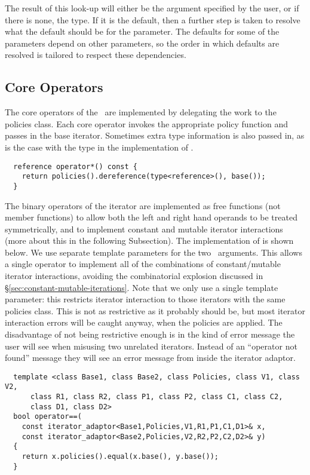 \documentclass{netobjectdays}
\newcommand{\iteratoradaptor}{\code{iterator\_\-adaptor}}
\begin{document}
The result of this look-up will either be the argument specified by the
user, or if there is none, the  type. If it is
the default, then a further step is taken to resolve what the default
should be for the parameter. The defaults for some of the parameters
depend on other parameters, so the order in which defaults are
resolved is tailored to respect these dependencies.


\subsection{Core Operators}

The core operators of the \iteratoradaptor\ are implemented by
delegating the work to the policies class. Each core operator invokes
the appropriate policy function and passes in the base
iterator. Sometimes extra type information is also passed in, as is
the case with the  type in the implementation of
.

{\footnotesize
\begin{verbatim}
  reference operator*() const {
    return policies().dereference(type<reference>(), base());
  }
\end{verbatim}
}

The binary operators of the iterator are implemented as free functions
(not member functions) to allow both the left and right hand operands
to be treated symmetrically, and to implement constant and mutable
iterator interactions (more about this in the following
Subsection). The implementation of  is shown below.
We use separate template parameters for the two \iteratoradaptor\
arguments. This allows a single operator to implement all of the
combinations of constant/mutable iterator interactions, avoiding the
combinatorial explosion discussed in
\S\ref{sec:constant-mutable-iterations}. Note that we only use a
single \code{Policies} template parameter: this restricts iterator
interaction to those iterators with the same policies class.  This is
not as restrictive as it probably should be, but most iterator
interaction errors will be caught anyway, when the policies are
applied. The disadvantage of not being restrictive enough is in the
kind of error message the user will see when misusing two unrelated
iterators. Instead of an ``operator not found'' message they will see
an error message from inside the iterator adaptor.

{\footnotesize
\begin{verbatim}
  template <class Base1, class Base2, class Policies, class V1, class V2,
      class R1, class R2, class P1, class P2, class C1, class C2, 
      class D1, class D2>
  bool operator==(
    const iterator_adaptor<Base1,Policies,V1,R1,P1,C1,D1>& x,
    const iterator_adaptor<Base2,Policies,V2,R2,P2,C2,D2>& y)
  {
    return x.policies().equal(x.base(), y.base());
  }
\end{verbatim}
}
\end{document}
